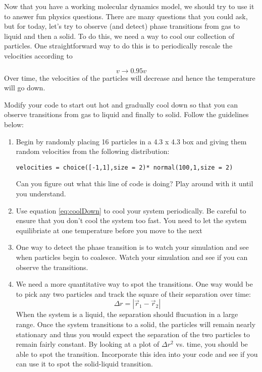 Now that you have a working molecular dynamics model, we should try to
use it to answer fun physics questions.  There are many questions that
you could ask, but for today, let's try to observe (and detect) phase
transitions from gas to liquid and then a solid.  To do this, we need
a way to cool our collection of particles.  One straightforward way to
do this is to periodically rescale the velocities according to 

\begin{equation}\label{eq:coolDown}
v \rightarrow 0.95 v
\end{equation}
Over time, the velocities of the particles will decrease and hence the
temperature will go down.

\begin{enumerate}
\prob Modify your code to start out hot and gradually cool down so
that you can observe transitions from gas to liquid and finally to
solid.  Follow the guidelines below:

\begin{enumerate}
\item Begin by randomly placing 16 particles in a 4.3 x 4.3 box and giving them
  random velocities from the following distribution:
\begin{Verbatim}
velocities = choice([-1,1],size = 2)* normal(100,1,size = 2)
\end{Verbatim}
Can you figure out what this line of code is doing?  Play around with
it until you understand.
\item Use equation \eqref{eq:coolDown} to cool your system
  periodically.  Be careful to ensure that you don't cool the system
  too fast.  You need to let the system equilibriate at one
  temperature before you move to the next
\item One way to detect the phase transition is to watch your
  simulation and see when particles begin to coalesce.  Watch your
  simulation and see if you can observe the transitions.
\item We need a more quantitative way to spot the transitions.  One way
  would be to pick any two particles and track the square of their
  separation over time:
\begin{equation}
\Delta r = |\vec{r}_1 - \vec{r}_2|
\end{equation}
When the system is a liquid, the separation should flucuation in a
large range.  Once the system transitions to a solid, the particles
will remain nearly stationary and thus you would expect the separation
of the two particles to remain fairly constant.  By looking at a plot
of $\Delta r^2$ vs. time, you should be able to spot the transition.
Incorporate this idea into your code and see if you can use it to spot
the solid-liquid transition.

\end{enumerate}

\end{enumerate}